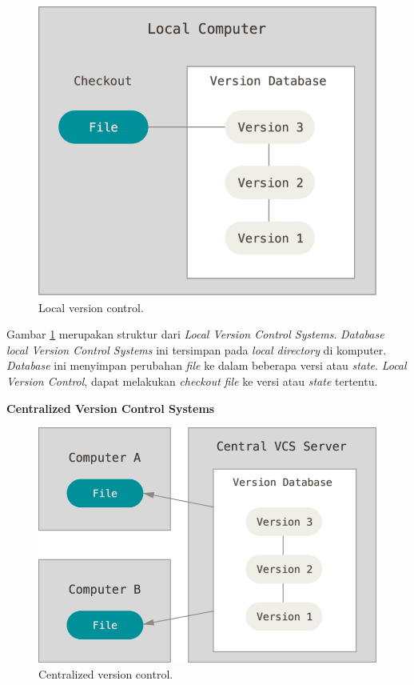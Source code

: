 \documentclass[a4paper,twoside]{article}
\begin{document}
\begin{enumerate}
\begin{figure}[H]
	\centering
		\includegraphics[scale=0.25]{Gambar/localvcs.png}
	\caption{Local version control\cite{chacon2014pro}.}
	\label{fig:localvcs}
\end{figure}

Gambar \ref{fig:localvcs} merupakan struktur dari \textit{Local Version Control Systems}. \textit{Database local Version Control Systems} ini tersimpan pada \textit{local directory} di komputer. \textit{Database} ini menyimpan perubahan \textit{file} ke dalam beberapa versi atau \textit{state}. \textit{Local Version Control}, dapat melakukan \textit{checkout} \textit{file} ke versi atau \textit{state} tertentu.   
 
\textbf{Centralized Version Control Systems}\\
\begin{figure}[H]
	\centering
		\includegraphics[scale=0.25]{Gambar/centralizedvcs.png}
	\caption{Centralized version control\cite{chacon2014pro}.}
	\label{fig:cvcs}
\end{figure}


\end{enumerate}
\end{document}
